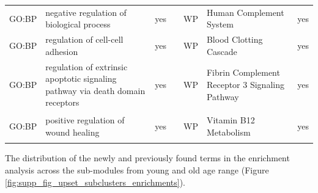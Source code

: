 \begin{longtable}{@{}lp{4cm}lllp{4cm}l@{}}
GO:BP           & negative regulation of biological process                                                                                          & yes              &           & WP              & Human Complement System                                                                                                                                                & yes              \\
GO:BP           & regulation of cell-cell adhesion                                                                                                   & yes              &           & WP              & Blood Clotting Cascade                                                                                                                                                 & yes              \\
GO:BP           & regulation of extrinsic apoptotic signaling pathway via death domain receptors          & yes              &           & WP              & Fibrin Complement Receptor 3 Signaling Pathway                                                                                                                         & yes              \\
GO:BP           & positive regulation of wound healing                                                                                               & yes              &           & WP              & Vitamin B12 Metabolism                                                                                                                                                 & yes             

\label{supp:table_c6_enrich}
\end{longtable}

\clearpage
The distribution of the newly and previously found terms in the enrichment analysis across the sub-modules from young and old age range (Figure \ref{fig:supp_fig_upset_subclusters_enrichments}).

